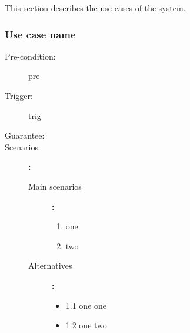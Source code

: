 This section describes the use cases of the system.

\subsubsection{Use case name}

\begin{description}
	\item[Pre-condition:] pre
	\item[Trigger:] trig
	\item[Guarantee:]
	\item[Scenarios]\textbf{:}\\
				\begin{description}
					\item[Main scenarios]\textbf{:}\\
								\begin{enumerate}
									\item one
									\item two
								\end{enumerate}
					\item[Alternatives]\textbf{:}\\
								\begin{itemize}
									\item 1.1 one one
									\item 1.2 one two
								\end{itemize}
				\end{description}
\end{description}


